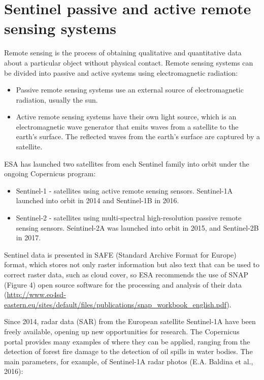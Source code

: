 \section{Sentinel passive and active remote sensing systems}
	Remote sensing is the process of obtaining qualitative and quantitative data about a particular object without physical contact.
	Remote sensing systems can be divided into passive and active systems using electromagnetic radiation:
	
	\begin{itemize}
		\item Passive remote sensing systems use an external source of electromagnetic radiation, usually the sun.
		\item Active remote sensing systems have their own light source, which is an electromagnetic wave generator that emits waves from a satellite to the earth's surface. The reflected waves from the earth's surface are captured by a satellite.
	\end{itemize}

	ESA has launched two satellites from each Sentinel family into orbit under the ongoing Copernicus program:
	
	\begin{itemize}
		\item Sentinel-1 - satellites using active remote sensing sensors. Sentinel-1A launched into orbit in 2014 and Sentinel-1B in 2016.
		\item Sentinel-2 - satellites using multi-spectral high-resolution passive remote sensing sensors. Seintinel-2A was launched into orbit in 2015, and Sentinel-2B in 2017.
	\end{itemize}

	Sentinel data is presented in SAFE (Standard Archive Format for Europe) format, which stores not only raster information but also text that can be used to correct raster data, such as cloud cover, so ESA recommends the use of SNAP (Figure 4) open source software for the processing and analysis of their data (\url{http://www.eo4sd-eastern.eu/sites/default/files/publications/snap_workbook_english.pdf}).
	
	Since 2014, radar data (SAR) from the European satellite Sentinel-1A have been freely available, opening up new opportunities for research. The Copernicus portal provides many examples of where they can be applied, ranging from the detection of forest fire damage to the detection of oil spills in water bodies. The main parameters, for example, of Sentinel-1A radar photos (E.A. Baldina et al., 2016):
	
